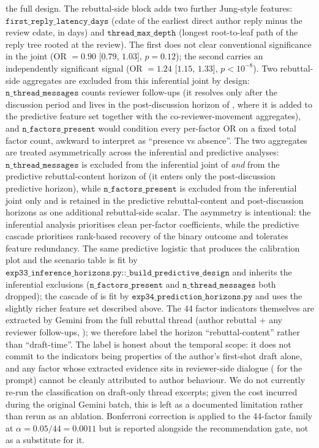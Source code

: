 \documentclass{article}
\newcommand{\code}[1]{\texttt{#1}}
\begin{document}
the full design. The rebuttal-side block adds two further Jung-style features: $\code{first\_reply\_latency\_days}$ (cdate of the earliest direct author reply minus the review cdate, in days) and $\code{thread\_max\_depth}$ (longest root-to-leaf path of the reply tree rooted at the review). The first does not clear conventional significance in the joint (OR $=0.90$ [$0.79$, $1.03$], $p = 0.12$); the second carries an independently significant signal (OR $=1.24$ [$1.15$, $1.33$], $p < 10^{-8}$). Two rebuttal-side aggregates are excluded from this inferential joint by design: $\code{n\_thread\_messages}$ counts reviewer follow-ups (it resolves only after the discussion period and lives in the post-discussion horizon of , where it is added to the predictive feature set together with the co-reviewer-movement aggregates), and $\code{n\_factors\_present}$ would condition every per-factor OR on a fixed total factor count, awkward to interpret as ``presence vs absence''. The two aggregates are treated asymmetrically across the inferential and predictive analyses: $\code{n\_thread\_messages}$ is excluded from the inferential joint of  \emph{and} from the predictive rebuttal-content horizon of  (it enters only the post-discussion predictive horizon), while $\code{n\_factors\_present}$ is excluded from the inferential joint only and is retained in the predictive rebuttal-content and post-discussion horizons as one additional rebuttal-side scalar. The asymmetry is intentional: the inferential analysis prioritises clean per-factor coefficients, while the predictive cascade prioritises rank-based recovery of the binary outcome and tolerates feature redundancy. The same predictive logistic that produces the calibration plot and the scenario table is fit by $\code{exp33\_inference\_horizons.py::\_build\_predictive\_design}$ and inherits the inferential exclusions ($\code{n\_factors\_present}$ and $\code{n\_thread\_messages}$ both dropped); the cascade of  is fit by $\code{exp34\_prediction\_horizons.py}$ and uses the slightly richer feature set described above. The 44 factor indicators themselves are extracted by Gemini from the full rebuttal thread (author rebuttal $+$ any reviewer follow-ups, ); we therefore label the horizon ``rebuttal-content'' rather than ``draft-time''. The label is honest about the temporal scope: it does not commit to the indicators being properties of the author's first-shot draft alone, and any factor whose extracted evidence sits in reviewer-side dialogue ( for the prompt) cannot be cleanly attributed to author behaviour. We do not currently re-run the classification on draft-only thread excerpts; given the cost incurred during the original Gemini batch, this is left as a documented limitation rather than rerun as an ablation. Bonferroni correction is applied to the 44-factor family at $\alpha = 0.05/44 = 0.0011$ but is reported alongside the recommendation gate, not as a substitute for it.
\end{document}
